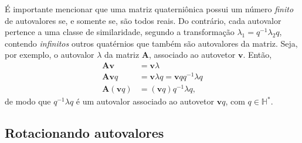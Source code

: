 \'E importante mencionar que uma matriz quaterni\^onica possui um n\'umero \emph{finito} de autovalores se, e somente se, s\~ao todos reais. Do contr\'ario, cada autovalor pertence a uma classe de similaridade, segundo a transforma\c c\~ao $ \lambda_1 = q^{-1} \lambda_2 q $, contendo \emph{infinitos} outros quat\'ernios que tamb\'em s\~ao autovalores da matriz. Seja, por exemplo, o autovalor $ \lambda $ da matriz $ \mathbf{A} $, associado ao autovetor $ \mathbf{v} $. Ent\~ao,
\begin{equation}
\begin{aligned}
\label{eq:similar}
\mathbf{A} \mathbf{v} &= \mathbf{v} \lambda \\
\mathbf{A} \mathbf{v} q &= \mathbf{v} \lambda q = \mathbf{v} q q^{-1} \lambda q \\
\mathbf{A} (\mathbf{v} q) &= (\mathbf{v} q) q^{-1} \lambda q,
\end{aligned}
\end{equation}
de modo que $ q^{-1} \lambda q $ \'e um autovalor associado ao autovetor $ \mathbf{v}q $, com $ q \in \mathbb{H}^\ast $.

\subsection{Rotacionando autovalores}
\label{subsec:rotacionando}

